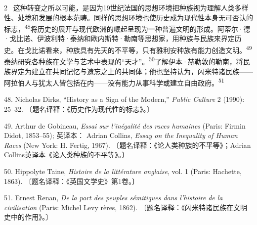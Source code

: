 \documentclass[10pt,a4paper]{article}
\begin{document}
\begin{paracol}{2}
\switchcolumn*
{\scriptsize\color{gray} [p. 11]}\ 这种转变之所以可能，是因为19世纪法国的思想环境把种族视为理解人类多样性、处境和发展的根本范畴。同样的思想环境也使历史成为现代性本身无可否认的标志，\nobreak\textsuperscript{48}将历史的展开与现代欧洲的崛起呈现为一种普遍文明的形成。阿蒂尔·德·戈比诺、伊波利特·泰纳和欧内斯特·勒南等思想家，用种族与民族来界定历史。在戈比诺看来，种族具有先天的不平等，只有雅利安种族有能力创造文\mbox{明。\textsuperscript{49}}泰纳研究各种族在文学与艺术中表现的“天才”。\nobreak\textsuperscript{50}了解伊本·赫勒敦的勒南，将民族界定为建立在共同记忆与遗忘之上的共同体；他也坚持认为，闪米特诸民族——阿拉伯人与犹太人皆包括在内——没有能力从事科学或建立自由政\mbox{府。\textsuperscript{51}}\par{\small 48. Nicholas Dirks, “History as a Sign of the Modern,” \textit{Public Culture} 2 (1990): 25–32. 〔题名译释：《历史作为现代性的标志》。〕\par}{\small 49. Arthur de Gobineau, \textit{Essai sur l’inégalité des races humaines} (Paris: Firmin Didot, 1853–55); 英译本： Adrian Collins, \textit{Essay on the Inequality of Human Races} (New York: H. Fertig, 1967). 〔题名译释：《论人类种族的不平等》；Adrian Collins英译本《论人类种族的不平等》。〕\par}{\small 50. Hippolyte Taine, \textit{Histoire de la littérature anglaise}, vol. 1 (Paris: Hachette, 1863). 〔题名译释：《英国文学史》第1卷。〕\par}{\small 51. Ernest Renan, \textit{De la part des peuples sémitiques dans l’histoire de la civilisation} (Paris: Michel Levy rères, 1862). 〔题名译释：《闪米特诸民族在文明史中的作用》。〕\par}
\switchcolumn

\end{paracol}
\end{document}
